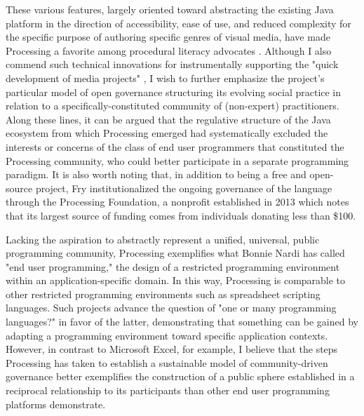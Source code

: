 These various features, largely oriented toward abstracting the existing Java platform in the direction of accessibility, ease of use, and reduced complexity for the specific purpose of authoring specific genres of visual media, have made Processing a favorite among procedural literacy advocates \autocites[e.g.,][110]{Mateas05}[105]{Manovich13}. Although I also commend such technical innovations for instrumentally supporting the "quick development of media projects" \autocite[105]{Manovich13}, I wish to further emphasize the project's particular model of open governance structuring its evolving social practice in relation to a specifically-constituted community of (non-expert) practitioners. Along these lines, it can be argued that the regulative structure of the Java ecosystem from which Processing emerged had systematically excluded the interests or concerns of the class of end user programmers that constituted the Processing community, who could better participate in a separate programming paradigm. It is also worth noting that, in addition to being a free and open-source project, Fry institutionalized the ongoing governance of the language through the Processing Foundation, a nonprofit established in 2013 which notes that its largest source of funding comes from individuals donating less than \$100.

Lacking the aspiration to abstractly represent a unified, universal, public programming community, Processing exemplifies what Bonnie Nardi has called "end user programming," the design of a restricted programming environment within an application-specific domain. In this way, Processing is comparable to other restricted programming environments such as spreadsheet scripting languages. Such projects advance the question of "one or many programming languages?" in favor of the latter, demonstrating that something can be gained by adapting a programming environment toward specific application contexts. However, in contrast to Microsoft Excel, for example, I believe that the steps Processing has taken to establish a sustainable model of community-driven governance better exemplifies the construction of a public sphere established in a reciprocal relationship to its participants than other end user programming platforms demonstrate.

